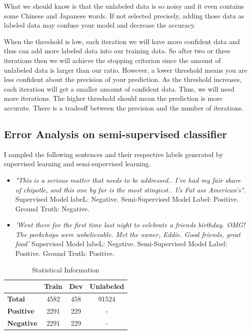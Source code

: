 What we should know is that the unlabeled data is so noisy and it even contains some Chinese and Japanese words. If not selected precisely, adding those data as labeled data may confuse your model and decrease the accuracy.

When the threshold is low, each iteration we will have more confident data and thus can add more labeled data into our training data. So after two or three iterations then we will achieve the stopping criterion since the amount of unlabeled data is larger than our ratio. However, a lower threshold means you are less confident about the precision of your prediction. As the threshold increases, each iteration will get a smaller amount of confident data. Thus, we will need more iterations. The higher threshold should mean the prediction is more accurate. There is a tradeoff between the precision and the number of iterations. 

\subsection{\textbf{Error Analysis on semi-supervised classifier}}

I sampled the following sentences and their respective labels generated by supervised learning and semi-supervised learning. 

\begin{itemize}
\item \textit{"This is a serious matter that needs to be addressed.. I've had my fair share of chipotle, and this one by far is the most stingiest.. Us Fat ass American's".} Supervised Model labeL: Negative. Semi-Supervised Model Label: Positive. Ground Truth: Negative.
\item \textit{'Went there for the first time last night to celebrate a friends birthday.  OMG!  The porkchops were unbelievable. Met the owner, Eddie.  Good friends, great food'} Supervised Model labeL: Negative. Semi-Supervised Model Label: Positive. Ground Truth: Positive.
\end{itemize}

\begin{table}[ht]  %
\centering  %
\caption{Statistical Information}
\begin{tabular}{lccc}
\hline
&    \textbf{Train} & \textbf{Dev} & \textbf{Unlabeled} \\
\hline
 \textbf{Total} & 4582 & 458 & 91524 \\
 \textbf{Positive}   & 2291 &  229 &  -   \\
 \textbf{Negative} &  2291 &  229  &  -  \\
\hline
\end{tabular}
\label{tab:stat}
\end{table}

